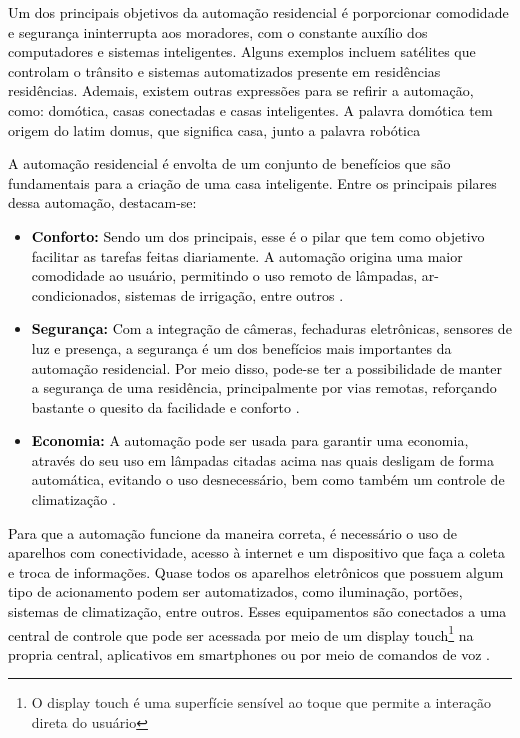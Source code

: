     \textcolor{black}{Um dos principais objetivos da automação residencial é porporcionar comodidade e segurança ininterrupta aos moradores, com o constante auxílio dos computadores e sistemas inteligentes. Alguns exemplos incluem satélites que controlam o trânsito e sistemas automatizados presente em residências residências\cite{algunsAspectos}. Ademais, existem outras expressões para se refirir a automação, como: domótica, casas conectadas e casas inteligentes. A palavra domótica tem origem do latim domus, que significa casa, junto a palavra robótica \cite{automacaoTecnologiaPraticidade}}

    \textcolor{black}{A automação residencial é envolta de um conjunto de benefícios que são fundamentais para a criação de uma casa inteligente. Entre os principais pilares dessa automação, destacam-se:}

    \begin{itemize}
        \item \textbf{\textcolor{black}{Conforto:}} \textcolor{black}{Sendo um dos principais, esse é o pilar que tem como objetivo facilitar as tarefas feitas diariamente. A automação origina uma maior comodidade ao usuário, permitindo o uso remoto de lâmpadas, ar-condicionados, sistemas de irrigação, entre outros \cite{automacaoTecnologiaPraticidade}.}
        
        \item \textbf{\textcolor{black}{Segurança:}} \textcolor{black}{Com a integração de câmeras, fechaduras eletrônicas, sensores de luz e presença, a segurança é um dos benefícios mais importantes da automação residencial. Por meio disso, pode-se ter a possibilidade de manter a segurança de uma residência, principalmente por vias remotas, reforçando bastante o quesito da facilidade e conforto \cite{automacaoTecnologiaPraticidade}.}
        
        \item \textbf{\textcolor{black}{Economia:}} \textcolor{black}{A automação pode ser usada para garantir uma economia, através do seu uso em lâmpadas citadas acima nas quais desligam de forma automática, evitando o uso desnecessário, bem como também um controle de climatização \cite{automacaoTecnologiaPraticidade}.}
        
    \end{itemize}

    \textcolor{black}{Para que a automação funcione da maneira correta, é necessário o uso de aparelhos com conectividade, acesso à internet e um dispositivo que faça a coleta e troca de informações. Quase todos os aparelhos eletrônicos que possuem algum tipo de acionamento podem ser automatizados, como iluminação, portões, sistemas de climatização, entre outros. Esses equipamentos são conectados a uma central de controle que pode ser acessada por meio de um display touch\footnote{O display touch é uma superfície sensível ao toque que permite a interação direta do usuário} na propria central, aplicativos em smartphones ou por meio de comandos de voz \cite{automacaoTecnologiaPraticidade}.}

